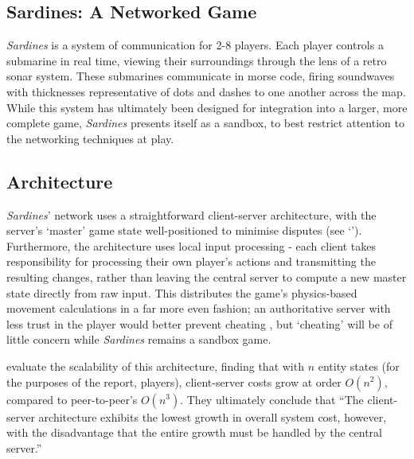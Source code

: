 \documentclass[a4paper, 9pt]{article}
\begin{document}
\graphicspath{{./Images/}}
\begin{flushleft}

\section*{Sardines: A Networked Game}

\textit{Sardines} is a system of communication for 2-8 players. Each player controls a submarine in real time, viewing their surroundings through the lens of a retro sonar system. These submarines communicate in morse code, firing soundwaves with thicknesses representative of dots and dashes to one another across the map. While this system has ultimately been designed for integration into a larger, more complete game, \textit{Sardines} presents itself as a sandbox, to best restrict attention to the networking techniques at play.

\subsection*{Architecture}\label{Architecture}

\textit{Sardines}' network uses a straightforward client-server architecture, with the server's `master' game state well-positioned to minimise disputes (see `'). Furthermore, the architecture uses local input processing - each client takes responsibility for processing their own player's actions and transmitting the resulting changes, rather than leaving the central server to compute a new master state directly from raw input. This distributes the game's physics-based movement calculations in a far more even fashion; an authoritative server with less trust in the player would better prevent cheating \citep{gmbta10}, but `cheating' will be of little concern while \textit{Sardines} remains a sandbox game.

\vspace{5pt}\noindent
\citeauthor{bauer04} \citeyearpar{bauer04} evaluate the scalability of this architecture, finding that with $n$ entity states (for the purposes of the report, players), client-server costs grow at order $O(n^2)$, compared to peer-to-peer's $O(n^3)$. They ultimately conclude that ``The client-server architecture exhibits the lowest growth in overall system cost, however, with the disadvantage that the entire growth must be handled by the central server.''  


\end{flushleft}
\end{document}
